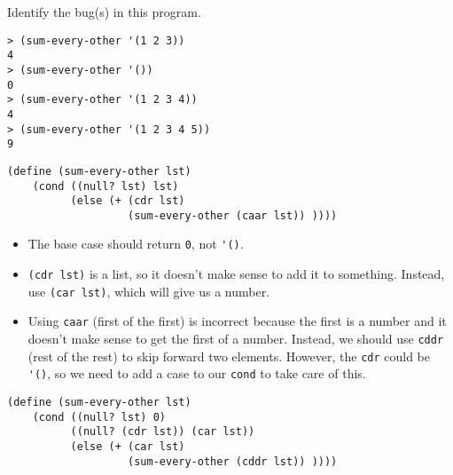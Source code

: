\begin{blocksection}
\question Identify the bug(s) in this program.

\begin{lstlisting}
> (sum-every-other '(1 2 3))
4
> (sum-every-other '())
0
> (sum-every-other '(1 2 3 4))
4
> (sum-every-other '(1 2 3 4 5))
9
\end{lstlisting}

\begin{lstlisting}
(define (sum-every-other lst)
    (cond ((null? lst) lst)
          (else (+ (cdr lst)
                   (sum-every-other (caar lst)) ))))
\end{lstlisting}

\begin{solution}
\begin{itemize}
\item The base case should return \lstinline$0$, not \lstinline$'()$.
\item \lstinline$(cdr lst)$ is a list, so it doesn't make sense to add it to something. 
Instead, use \lstinline$(car lst)$, which will give us a number.
\item Using \lstinline$caar$ (first of the first) is incorrect because the first is a
number and it doesn't make sense to get the first of a number. Instead, we should use
\lstinline$cddr$ (rest of the rest) to skip forward two elements. However, the
\lstinline$cdr$ could be \lstinline$'()$, so we need to add a case to our \lstinline$cond$
to take care of this.
\end{itemize}

\begin{lstlisting}
(define (sum-every-other lst)
    (cond ((null? lst) 0)
          ((null? (cdr lst)) (car lst))
          (else (+ (car lst)
                   (sum-every-other (cddr lst)) ))))
\end{lstlisting}
\end{solution}
\end{blocksection}
